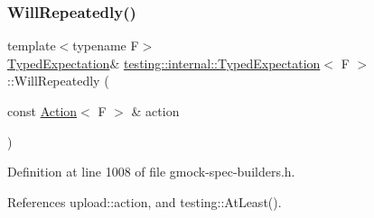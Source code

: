 \subsubsection{\texorpdfstring{Will\+Repeatedly()}{WillRepeatedly()}}
{\footnotesize\ttfamily template$<$typename F$>$ \\
\hyperlink{classtesting_1_1internal_1_1TypedExpectation}{Typed\+Expectation}\& \hyperlink{classtesting_1_1internal_1_1TypedExpectation}{testing\+::internal\+::\+Typed\+Expectation}$<$ F $>$\+::Will\+Repeatedly (\begin{DoxyParamCaption}\item[{const \hyperlink{classtesting_1_1Action}{Action}$<$ F $>$ \&}]{action }\end{DoxyParamCaption})\hspace{0.3cm}{\ttfamily [inline]}}



Definition at line 1008 of file gmock-\/spec-\/builders.\+h.



References upload\+::action, and testing\+::\+At\+Least().



